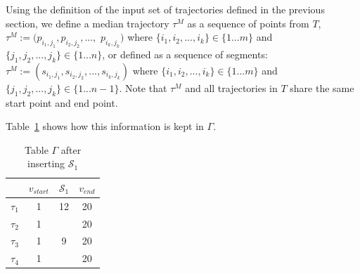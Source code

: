 Using the definition of the input set of trajectories defined in the previous section, we define a median trajectory $\tau^{M}$ as a sequence of points from $T$, $\tau^{M}:=(p_{i_{1},j_{1}},p_{i_{2},j_{2}},...,$ $p_{i_{k},j_{k}})$ where $\{i_{1},i_{2},...,i_{k}\} \in \{1 ... m\}$ and $\{j_{1},j_{2},...,j_{k}\} \in \{ 1 ... n\}$, or defined as a sequence of segments: $\tau^{M}:=(s_{i_{1},j_{1}},s_{i_{2},j_{2}}, ...,s_{i_{k},j_{k}})$ where $\{i_{1},i_{2},...,i_{k}\} \in \{1 ... m\}$ and $\{j_{1},j_{2},...,j_{k}\} \in \{1 ... n-1\}$. 
Note that $\tau^{M}$ and all trajectories in $T$ share the same start point and end point.   


%  

Table~\ref{tab:tab_begin} shows how this information is kept in $\Gamma$. 
\begin{table}
\centering
\caption{Table $\Gamma$ after inserting $\mathcal{S}_{1}$}
\label{tab:tab_begin}
\begin{tabular}{cccc}
\toprule

 & $v_{start}$ & $\mathcal{S}_{1}$ & $v_{end}$\\
\midrule
$\tau_{1}$ & 1 & 12& 20\\
$\tau_{2}$ & 1 &  & 20\\
$\tau_{3}$ & 1 & 9 & 20\\
$\tau_{4}$ & 1 &  & 20\\
\bottomrule
\end{tabular}
\end{table}


